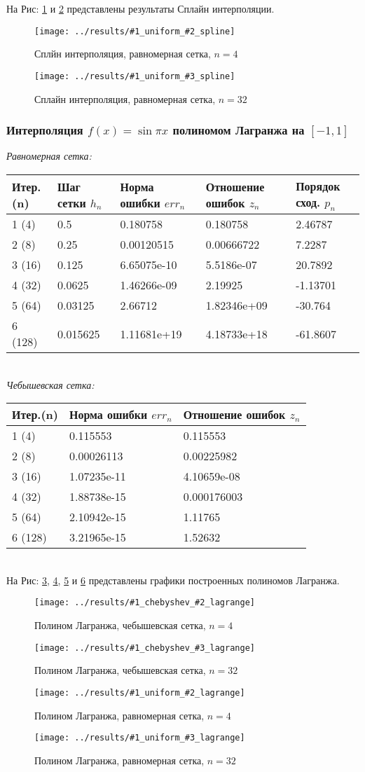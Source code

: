 \documentclass[12pt]{article}
\newcommand{\lagrange}[3] {
	На Рис: \ref{fig:#1chebyshev#2lagrange},  \ref{fig:#1chebyshev#3lagrange}, \ref{fig:#1uniform#2lagrange} и \ref{fig:#1uniform#3lagrange}
	представлены графики построенных полиномов Лагранжа.
	
	\begin{figure}[H]
		\centering
		\texttt{[image: ../results/\#1\_chebyshev\_\#2\_lagrange]}
		\caption{Полином Лагранжа, чебышевская сетка, $n = #2$}
		\label{fig:#1chebyshev#2lagrange}
	\end{figure}
	\begin{figure}[H]
		\centering
		\texttt{[image: ../results/\#1\_chebyshev\_\#3\_lagrange]}
		\caption{Полином Лагранжа, чебышевская сетка, $n = #3$}
		\label{fig:#1chebyshev#3lagrange}
	\end{figure}
	\begin{figure}[H]
		\centering
		\texttt{[image: ../results/\#1\_uniform\_\#2\_lagrange]}
		\caption{Полином Лагранжа, равномерная сетка, $n = #2$}
		\label{fig:#1uniform#2lagrange}
	\end{figure}
	\begin{figure}[H]
		\centering
		\texttt{[image: ../results/\#1\_uniform\_\#3\_lagrange]}
		\caption{Полином Лагранжа, равномерная сетка, $n = #3$}
		\label{fig:#1uniform#3lagrange}
	\end{figure}
}
\newcommand{\spline}[3] {
	На Рис:  \ref{fig:#1uniform#2spline} и \ref{fig:#1uniform#3spline} представлены результаты Сплайн интерполяции.
	
	\begin{figure}[H]
		\centering
		\texttt{[image: ../results/\#1\_uniform\_\#2\_spline]}
		\caption{Сплйн интерполяция, равномерная сетка, $n = #2$}
		\label{fig:#1uniform#2spline}
	\end{figure}
	\begin{figure}[H]
		\centering
		\texttt{[image: ../results/\#1\_uniform\_\#3\_spline]}
		\caption{Сплайн интерполяция, равномерная сетка, $n = #3$}
		\label{fig:#1uniform#3spline}
	\end{figure}
}
\begin{document}
\spline{sin125}{4}{32}

\subsubsection{Интерполяция  $f(x) = \sin{\pi x}$ полиномом Лагранжа на $[-1, 1]$}
\textit{Равномерная сетка:}\\


\begin{tabular}{|l|l|l|l|l|}
	\hline 
	Итер.(n) & Шаг сетки $h_n$ & Норма ошибки $err_n$ &  Отношение ошибок $z_n$ & Порядок сход. $p_n$ \\ \hline
	1 (4)  & 0.5 & 0.180758 & 0.180758 & 2.46787 \\ \hline
	2 (8)  & 0.25 & 0.00120515 & 0.00666722 & 7.2287 \\ \hline
	3 (16)  & 0.125 & 6.65075e-10 & 5.5186e-07 & 20.7892 \\ \hline
	4 (32)  & 0.0625 & 1.46266e-09 & 2.19925 & -1.13701 \\ \hline
	5 (64)  & 0.03125 & 2.66712 & 1.82346e+09 & -30.764 \\ \hline
	6 (128)  & 0.015625 & 1.11681e+19 & 4.18733e+18 & -61.8607 \\ \hline
\end{tabular}\\


\textit{Чебышевская сетка:}\\


\begin{tabular}{|l|l|l|}
	\hline 
	Итер.(n) & Норма ошибки $err_n$ &  Отношение ошибок $z_n$ \\ \hline
	1 (4)  &  0.115553 & 0.115553 \\ \hline
	2 (8)  &  0.00026113 & 0.00225982  \\ \hline
	3 (16)  & 1.07235e-11 & 4.10659e-08  \\ \hline
	4 (32)  &  1.88738e-15 & 0.000176003  \\ \hline
	5 (64)  &  2.10942e-15 & 1.11765 \\ \hline
	6 (128)  & 3.21965e-15 & 1.52632  \\ \hline
\end{tabular}\\

\lagrange{sin1}{4}{32}
\end{document}
